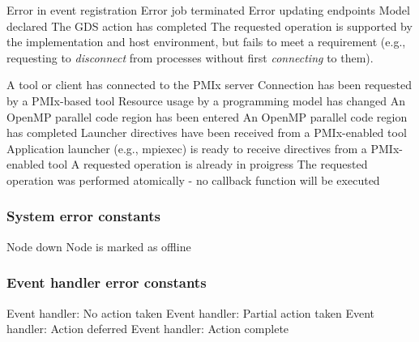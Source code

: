 \begin{constantdesc}
%
Error in event registration
%
Error job terminated
%
Error updating endpoints
%
Model declared
%
The \ac{GDS} action has completed
%
The requested operation is supported by the implementation and host environment, but fails to meet a requirement (e.g., requesting to \textit{disconnect} from processes without first \textit{connecting} to them).

A tool or client has connected to the \ac{PMIx} server
%
Connection has been requested by a PMIx-based tool
%
Resource usage by a programming model has changed
%
An OpenMP parallel code region has been entered
%
An OpenMP parallel code region has completed
%
Launcher directives have been received from a PMIx-enabled tool
%
Application launcher (e.g., mpiexec) is ready to receive directives from a PMIx-enabled tool
%
A requested operation is already in proigress
%
The requested operation was performed atomically - no callback function will be executed

\end{constantdesc}

\subsubsection{System error constants}

\begin{constantdesc}
%
Node down
%
Node is marked as offline
%
\end{constantdesc}

\subsubsection{Event handler error constants}

\begin{constantdesc}
%
Event handler: No action taken
%
Event handler: Partial action taken
%
Event handler: Action deferred
%
Event handler: Action complete
%
\end{constantdesc}

